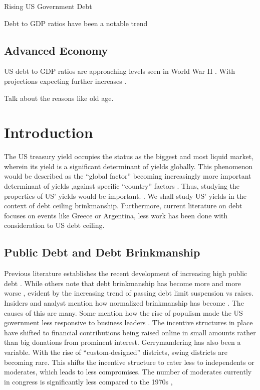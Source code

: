 \documentclass[
  12pt]{article}
\begin{document}
Rising US Government Debt

Debt to GDP ratios have been a notable trend

\hypertarget{advanced-economy}{%
\subsection{Advanced Economy}\label{advanced-economy}}

US debt to GDP ratios are approaching levels seen in World War II
\citep{yared2019} . With projections expecting further increases
\citep{congressionalbudgetoffice2023}.

Talk about the reasons like old age.

\hypertarget{introduction}{%
\section{Introduction}\label{introduction}}

The US treasury yield occupies the status as the biggest and most liquid
market, wherein its yield is a significant determinant of yields
globally. This phenomenon would be described as the ``global factor''
becoming increasingly more important determinant of yields ,against
specific ``country'' factors \citep{mauro2002}. Thus, studying the
properties of US' yields would be important.
\citep{rozada2006, gonzález-rozada2008, longstaff2011}. We shall study
US' yields in the context of debt ceiling brinkmanship. Furthermore,
current literature on debt focuses on events like Greece or Argentina,
less work has been done with consideration to US debt ceiling.

\hypertarget{public-debt-and-debt-brinkmanship}{%
\subsection{Public Debt and Debt
Brinkmanship}\label{public-debt-and-debt-brinkmanship}}

Previous literature establishes the recent development of increasing
high public debt \citep[ ]{mitchener2023}. While others note that debt
brinkmanship has become more and more worse \citep{berman} , evident by
the increasing trend of passing debt limit suspension vs raises.
Insiders and analyst mention how normalized brinkmanship has become
\citep{bivens}. The causes of this are many. Some mention how the rise
of populism made the US government less responsive to business leaders
\citep{cook2023} . The incentive structures in place have shifted to
financial contributions being raised online in small amounts rather than
big donations from prominent interest. Gerrymandering has also been a
variable. With the rise of ``custom-designed'' districts, swing
districts are becoming rare. This shifts the incentive structure to
cater less to independents or moderates, which leads to less
compromises. The number of moderates currently in congress is
significantly less compared to the 1970s \citep{desilver2022},
\end{document}

